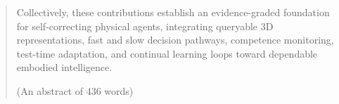 \begin{abstract}
Collectively, these contributions establish an evidence-graded foundation for self-correcting physical agents, integrating queryable 3D representations, fast and slow decision pathways, competence monitoring, test-time adaptation, and continual learning loops toward dependable embodied intelligence.

\vspace{1em}
\noindent(An abstract of 436 words)

\end{abstract}
